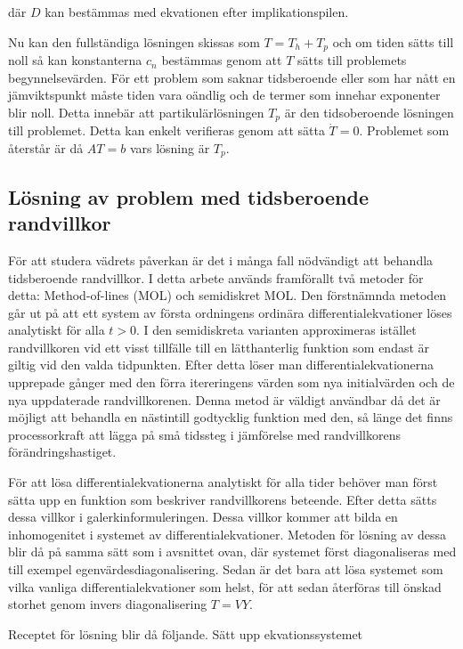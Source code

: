 där $D$ kan bestämmas med ekvationen efter implikationspilen.

Nu kan den fullständiga lösningen skissas som $T = T_h + T_p$ och om
tiden sätts till noll så kan konstanterna $c_n$ bestämmas genom
att $T$ sätts till problemets begynnelsevärden. För ett problem som
saknar tidsberoende eller som har nått en jämviktspunkt måste
tiden vara oändlig och de termer som innehar exponenter blir noll.
Detta innebär att partikulärlösningen $T_p$ är den tidsoberoende lösningen
till problemet. Detta kan enkelt verifieras genom att sätta $\dot{T} = 0$.
Problemet som återstår är då $AT = b$ vars lösning är $T_p$.

\subsection{Lösning av problem med tidsberoende randvillkor}
\label{subsec:mol}

För att studera vädrets påverkan är det i många fall nödvändigt att behandla
tidsberoende randvillkor. I detta arbete används framförallt två metoder för detta:
Method-of-lines (MOL) och semidiskret MOL. Den förstnämnda metoden går ut på att
ett system av första ordningens ordinära differentialekvationer löses analytiskt för
alla $t>0$. I den semidiskreta varianten approximeras istället randvillkoren vid
ett visst tillfälle till en lätthanterlig funktion som endast är giltig vid
den valda tidpunkten. Efter detta löser man differentialekvationerna upprepade gånger
med den förra itereringens värden som nya initialvärden och de nya uppdaterade
randvillkorenen. Denna metod är väldigt användbar då det är möjligt att behandla en nästintill godtycklig
funktion med den, så länge det finns  processorkraft att lägga på små tidssteg i jämförelse med
randvillkorens förändringshastiget.

För att lösa differentialekvationerna analytiskt för alla tider behöver man först
sätta upp en funktion som beskriver randvillkorens beteende. Efter detta sätts
dessa villkor i galerkinformuleringen. Dessa villkor kommer att bilda en inhomogenitet
i systemet av differentialekvationer. Metoden för lösning av dessa
blir då på samma sätt som i avsnittet ovan,
där systemet först diagonaliseras med till exempel egenvärdesdiagonalisering. Sedan är det bara att lösa systemet som vilka vanliga differentialekvationer som helst, för att sedan återföras till önskad storhet genom
invers diagonalisering $T = VY$.

Receptet för lösning blir då följande. Sätt upp ekvationssystemet

